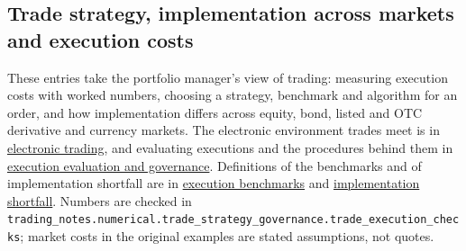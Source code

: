 \subsection{Trade strategy, implementation across markets and execution costs}

These entries take the portfolio manager's view of trading: measuring execution costs with worked numbers, choosing a strategy, benchmark and algorithm for an order, and how implementation differs across equity, bond, listed and OTC derivative and currency markets. The electronic environment trades meet is in \hyperref[def:electronic-trading-environment]{electronic trading}, and evaluating executions and the procedures behind them in \hyperref[meth:trade-execution-evaluation-governance]{execution evaluation and governance}. Definitions of the benchmarks and of implementation shortfall are in \hyperref[def:execution-benchmark]{execution benchmarks} and \hyperref[def:implementation-shortfall]{implementation shortfall}. Numbers are checked in \nolinkurl{trading_notes.numerical.trade_strategy_governance.trade_execution_checks}; market costs in the original examples are stated assumptions, not quotes.

